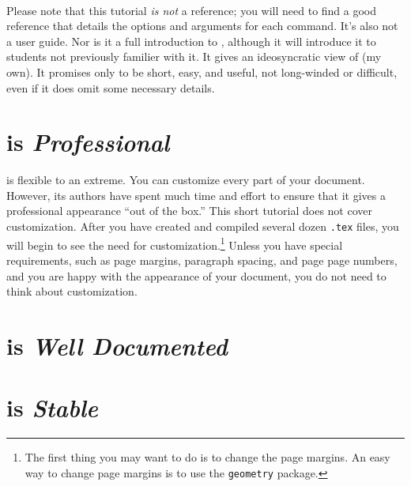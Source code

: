 \documentclass[letterpaper]{article}
\begin{document}
    \paragraph{}Please note that this tutorial \textit{is not} a \LaTeXe{} reference; you will need to find a good reference that details the options and arguments for each command. It's also not a user guide. Nor is it a full introduction to \LaTeXe{}, although it will introduce it to students not previously familier with it. It gives an ideosyncratic view of \LaTeXe{} (my own). It promises only to be short, easy, and useful, not long-winded or difficult, even if it does omit some necessary details. 

    

    \section*{\LaTeXe{} is \textit{Professional}}

    \LaTeXe{} is flexible to an extreme. You can customize every part of your document. However, its authors have spent much time and effort to ensure that it gives a professional appearance ``out of the box.'' This short tutorial does not cover customization. After you have created and compiled several dozen \texttt{.tex} files, you will begin to see the need for customization.\footnote{The first thing you may want to do is to change the page margins. An easy way to change page margins is to use the \texttt{geometry} package.} Unless you have special requirements, such as page margins, paragraph spacing, and page page numbers, and you are happy with the appearance of your document, you do not need to think about customization.

    

    \section*{\LaTeXe{} is \textit{Well Documented}}

    

    \section*{\LaTeXe{} is \textit{Stable}}
\end{document}
